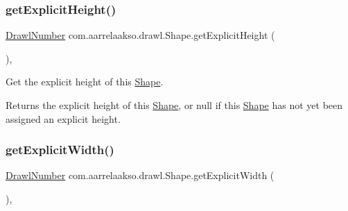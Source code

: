 \mbox{\label{classcom_1_1aarrelaakso_1_1drawl_1_1_shape_a76cd6b4d9f427f1888fc98fd653ee496}} 
\subsubsection{\texorpdfstring{get\+Explicit\+Height()}{getExplicitHeight()}}
{\footnotesize\ttfamily \hyperlink{classcom_1_1aarrelaakso_1_1drawl_1_1_drawl_number}{Drawl\+Number} com.\+aarrelaakso.\+drawl.\+Shape.\+get\+Explicit\+Height (\begin{DoxyParamCaption}{ }\end{DoxyParamCaption})\hspace{0.3cm}{\ttfamily [protected]}, {\ttfamily [inherited]}}



Get the explicit height of this \hyperlink{classcom_1_1aarrelaakso_1_1drawl_1_1_shape}{Shape}. 

\begin{DoxyReturn}{Returns}
the explicit height of this \hyperlink{classcom_1_1aarrelaakso_1_1drawl_1_1_shape}{Shape}, or {\ttfamily null} if this \hyperlink{classcom_1_1aarrelaakso_1_1drawl_1_1_shape}{Shape} has not yet been assigned an explicit height. 
\end{DoxyReturn}
\mbox{\label{classcom_1_1aarrelaakso_1_1drawl_1_1_shape_aabb6ac3a04620e1c760bcea54797cba8}} 
\subsubsection{\texorpdfstring{get\+Explicit\+Width()}{getExplicitWidth()}}
{\footnotesize\ttfamily \hyperlink{classcom_1_1aarrelaakso_1_1drawl_1_1_drawl_number}{Drawl\+Number} com.\+aarrelaakso.\+drawl.\+Shape.\+get\+Explicit\+Width (\begin{DoxyParamCaption}{ }\end{DoxyParamCaption})\hspace{0.3cm}{\ttfamily [protected]}, {\ttfamily [inherited]}}



